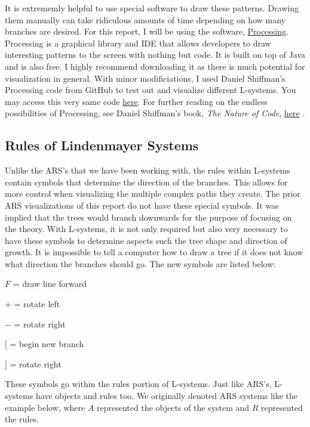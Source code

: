 \documentclass{article}
\begin{document}
\medskip\noindent
It is extrememly helpful to use special software to draw these patterns. Drawing them manually can take ridiculous amounts of time depending on how many branches are desired. For this report, I will be using the software, \href{https://processing.org/Processing}{Processing}. Processing is a graphical library and IDE that allows developers to draw interesting patterns to the screen with nothing but code. It is built on top of Java and is also free. I highly recommend downloading it as there is much potential for visualization in general. With minor modificiations, I used Daniel Shiffman's Processing code from GitHub to test out and visualize different L-systems. You may access this very same code \href{https://github.com/nature-of-code/noc-examples-processing/tree/master/chp08_fractals/NOC_8_09_LSystem}{here}. For further reading on the endless possibilities of Processing, see Daniel Shiffman's book, \emph{The Nature of Code}, \href{https://natureofcode.com/}{here} \cite{NC}.

\subsection{Rules of Lindenmayer Systems}

\medskip\noindent
Unlike the ARS's that we have been working with, the rules within L-systems contain symbols that determine the direction of the branches. This allows for more control when visualizing the multiple complex paths they create. The prior ARS visualizations of this report do not have these special symbols. It was implied that the trees would branch downwards for the purpose of focusing on the theory. With L-systems, it is not only required but also very necessary to have these symbols to determine aspects such the tree shape and direction of growth. It is impossible to tell a computer how to draw a tree if it does not know what direction the branches should go. The new symbols are listed below:

\medskip
  $F$  = draw line forward

\smallskip
  $+$  =  rotate left

\smallskip
  $-$  =  rotate right

\smallskip
  $[$  =  begin new branch

\smallskip
  $]$  =  rotate right

\medskip\noindent
These symbols go within the rules portion of L-systems. Just like ARS's, L-systems have objects and rules too. We originally denoted ARS systems like the example below, where $A$ represented the objects of the system and $R$ represented the rules.
\end{document}
